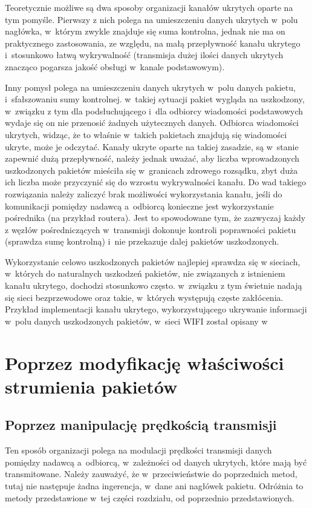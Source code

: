 \documentclass[a4paper, twoside, 12pt]{report}
\begin{document}
        Teoretycznie możliwe są dwa
        sposoby organizacji kanałów ukrytych oparte na tym pomyśle. Pierwszy z nich polega na umieszczeniu
        danych ukrytych w~polu nagłówka, w~którym zwykle znajduje się suma kontrolna,
        jednak nie ma on praktycznego zastosowania, ze względu, na małą przepływność
        kanału ukrytego i~stosunkowo łatwą wykrywalność (transmisja dużej ilości
        danych ukrytych znacząco pogarsza jakość obsługi w~kanale podstawowym).

        Inny pomysł polega
        na umieszczeniu danych ukrytych w~polu danych pakietu, i~sfałszowaniu sumy
        kontrolnej. w~takiej sytuacji pakiet wygląda na uszkodzony, w~związku z tym
        dla podsłuchującego i~dla odbiorcy wiadomości podstawowych wydaje się
        on nie przenosić żadnych użytecznych danych. Odbiorca wiadomości ukrytych,
        widząc, że to właśnie w~takich pakietach znajdują się wiadomości ukryte,
        może je odczytać. Kanały ukryte oparte na takiej zasadzie, są w~stanie
        zapewnić dużą przepływność, należy jednak uważać, aby liczba wprowadzonych
        uszkodzonych pakietów mieściła się w~granicach zdrowego rozsądku, zbyt duża
        ich liczba może przyczynić się do wzrostu wykrywalności kanału. Do wad takiego
        rozwiązania należy zaliczyć brak możliwości wykorzystania kanału, jeśli do
        komunikacji pomiędzy nadawcą a~odbiorcą konieczne jest wykorzystanie pośrednika (na przykład routera).
        Jest to spowodowane tym, że zazwyczaj każdy z węzłów pośredniczących w~transmisji
        dokonuje kontroli poprawności pakietu (sprawdza sumę kontrolną) i~nie przekazuje
        dalej pakietów uszkodzonych.

        Wykorzystanie celowo uszkodzonych pakietów najlepiej sprawdza się w
        sieciach, w~których do naturalnych uszkodzeń pakietów, nie związanych z
        istnieniem kanału ukrytego, dochodzi stosunkowo często. w~związku z tym
        świetnie nadają się sieci bezprzewodowe oraz takie, w~których występują
        częste zakłócenia. Przykład implementacji kanału ukrytego, wykorzystującego
        ukrywanie informacji w~polu danych uszkodzonych pakietów, w~sieci WIFI
        został opisany w~\cite{HICCUPS}

    \section{Poprzez modyfikację właściwości strumienia pakietów} \label{MODYFIKACJASTRUMIENIA}
        \subsection{Poprzez manipulację prędkością transmisji}
        Ten sposób organizacji polega na modulacji prędkości transmisji danych
        pomiędzy nadawcą a~odbiorcą, w~zależności od danych ukrytych, które mają
        być transmitowane. Należy zauważyć, że w~przeciwieństwie do poprzednich
        metod, tutaj nie następuje żadna ingerencja, w~dane ani nagłówek pakietu.
        Odróżnia to metody przedstawione w~tej części rozdziału, od poprzednio
        przedstawionych.
\end{document}
